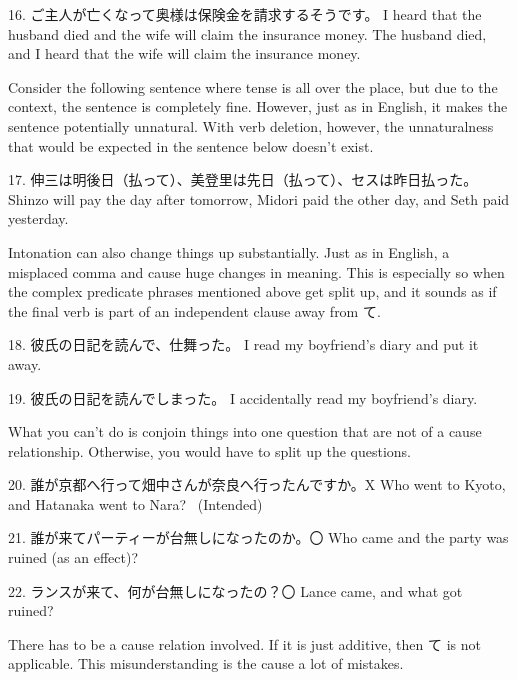 \par{16. ご主人が亡くなって奥様は保険金を請求するそうです。 \hfill\break
I heard that the husband died and the wife will claim the insurance money. \hfill\break
The husband died, and I heard that the wife will claim the insurance money. }

\par{ Consider the following sentence where tense is all over the place, but due to the context, the sentence is completely fine. However, just as in English, it makes the sentence potentially unnatural. With verb deletion, however, the unnaturalness that would be expected in the sentence below doesn't exist. }

\par{17. 伸三は明後日（払って）、美登里は先日（払って）、セスは昨日払った。 \hfill\break
Shinzo will pay the day after tomorrow, Midori paid the other day, and Seth paid yesterday. }

\par{ Intonation can also change things up substantially. Just as in English, a misplaced comma and cause huge changes in meaning. This is especially so when the complex predicate phrases mentioned above get split up, and it sounds as if the final verb is part of an independent clause away from て. }

\par{18. 彼氏の日記を読んで、仕舞った。 \hfill\break
I read my boyfriend's diary and put it away. }

\par{19. 彼氏の日記を読んでしまった。 \hfill\break
I accidentally read my boyfriend's diary. }

\par{ What you can't do is conjoin things into one question that are not of a cause relationship. Otherwise, you would have to split up the questions. }

\par{20. 誰が京都へ行って畑中さんが奈良へ行ったんですか。X \hfill\break
Who went to Kyoto, and Hatanaka went to Nara?  (Intended) }

\par{21. 誰が来てパーティーが台無しになったのか。〇 \hfill\break
Who came and the party was ruined (as an effect)? }

\par{22. ランスが来て、何が台無しになったの？〇 \hfill\break
Lance came, and what got ruined? }

\par{ There has to be a cause relation involved. If it is just additive, then て is not applicable. This misunderstanding is the cause a lot of mistakes. }

